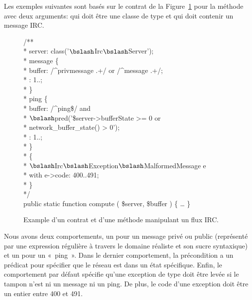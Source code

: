 Les exemples suivantes sont basés sur le contrat de la
Figure~\ref{figure:test:irc} pour la méthode  avec deux arguments:
 qui doit être une classe de type
 et  qui doit contenir un message
IRC.
%
\begin{figure}

\begin{bigpre}
/** \\
 * \arequires server: class('\(\bslash\)Irc\(\bslash\)Server'); \\
 * \abehavior message \{ \\
 *     \arequires buffer: /^privmessage .+/ or /^message .+/; \\
 *     \aensures  \aresult: 1..; \\
 * \} \\
 * \abehavior ping \{ \\
 *     \arequires buffer: /^ping\$/ and \\
 *               \(\bslash\)pred('\$server->bufferState   >= 0 or \\
 *                      network\_buffer\_state() >  0'); \\
 *     \aensures  \aresult: 1..; \\
 * \} \\
 * \adefault \{ \\
 *     \athrowable \(\bslash\)Irc\(\bslash\)Exception\(\bslash\)MalformedMessage e \\
 *                    with e->code: 400..491; \\
 * \} \\
 */ \\
public static function compute ( \$server, \$buffer ) \{ … \}
\end{bigpre}

\caption{\label{figure:test:irc} Example d'un contrat et d'une méthode
manipulant un flux IRC.}

\end{figure}
%
Nous avons deux comportements, un pour un message privé ou public (représenté
par une expression régulière à travers le domaine réaliste  et son
sucre syntaxique) et un pour un «~ping~». Dans le dernier comportement, la
précondition a un prédicat pour spécifier que le réseau est dans un état
spécifique. Enfin, le comportement par défaut spécifie qu'une exception de type
 doit être levée
si le tampon n'est ni un message ni un ping. De plus, le code d'une exception
doit être un entier entre 400 et 491.


